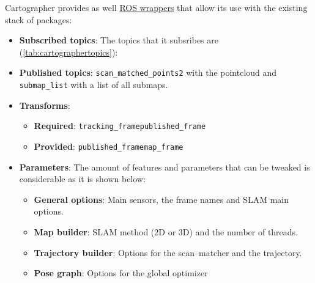 Cartographer provides as well \href{https://google-cartographer-ros.readthedocs.io/en/latest/}{ROS wrappers} that allow its use with the existing stack of packages:
\begin{itemize}
  \item \textbf{Subscribed topics}: The topics that it subsribes are (\autoref{tab:cartographertopics}):   
    \begin{table}[htb]
      \centering
      \caption{Cartographer subscribed topics}
      \label{tab:cartographertopics}
    \end{table}
  
  \item \textbf{Published topics}: \texttt{scan\_matched\_points2} with the pointcloud and \texttt{submap\_list} with a list of all submaps.

  \item \textbf{Transforms}:
    \begin{itemize}
      \item \textbf{Required}: \texttt{tracking\_frame}\arrow\texttt{published\_frame}
      \item \textbf{Provided}: \texttt{published\_frame}\arrow\texttt{map\_frame}
    \end{itemize}    

  \item \textbf{Parameters}: The amount of features and parameters that can be tweaked is considerable as it is shown below:
  \begin{itemize}
    \item \textbf{General options}: Main sensors, the frame names and SLAM main options.
    \item \textbf{Map builder}: SLAM method (2D or 3D) and the number of threads.
    \item \textbf{Trajectory builder}: Options for the scan--matcher and the trajectory.
    \item \textbf{Pose graph}: Options for the global optimizer
  \end{itemize}  
\end{itemize}

